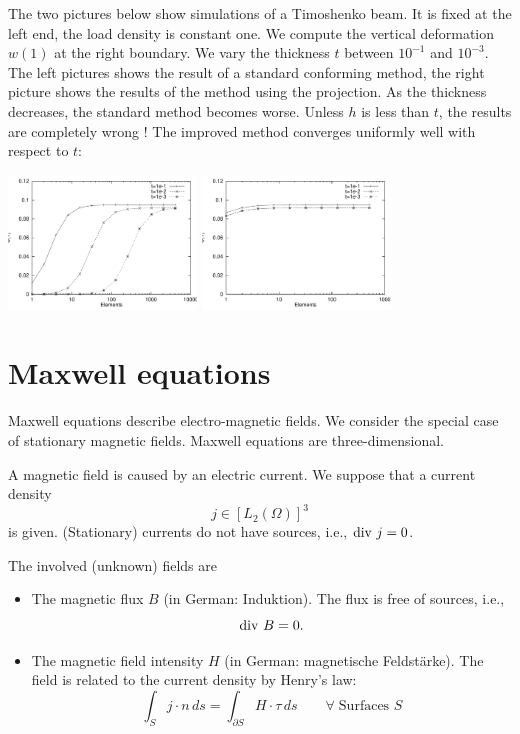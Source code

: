 The two pictures below show simulations of a Timoshenko beam. It is fixed at the 
left end, the load density is constant one. We compute the vertical deformation $w(1)$
at the right boundary. We vary the thickness $t$ between $10^{-1}$ and $10^{-3}$.
The left pictures shows the result of a standard conforming method, the right picture
shows the results of the method using the projection. As the thickness decreases, the 
standard method becomes worse. Unless $h$ is less than $t$, the results are completely 
wrong ! The improved method converges uniformly well with respect to $t$:
\begin{center}
\includegraphics[width=5cm]{pictures/timowntbad}
\hspace{2cm}
\includegraphics[width=5cm]{pictures/timowntgood}
\end{center}


\section{Maxwell equations}
%
Maxwell equations describe electro-magnetic fields. 
We consider the special case of stationary magnetic fields. 
Maxwell equations are three-dimensional.

A magnetic field is caused by an electric current. We suppose that a current density
$$
j \in [L_2(\Omega)]^3
$$
is given. (Stationary) currents do not have sources, i.e., $\operatorname{div} \, j = 0$. 

The involved (unknown) fields are 
\begin{itemize}
\item
The magnetic flux $B$  (in German: Induktion). The flux is free of sources, i.e.,
$$
\operatorname{div} \, B = 0.
$$
\item 
The magnetic field intensity $H$ (in German: magnetische Feldst\"arke). The field
is related to the current density by Henry's law: 
$$
\int_S j \cdot n \, ds = \int_{\partial S} H \cdot \tau \, ds  \qquad \forall \; \mbox{Surfaces } S
$$
\end{itemize}

